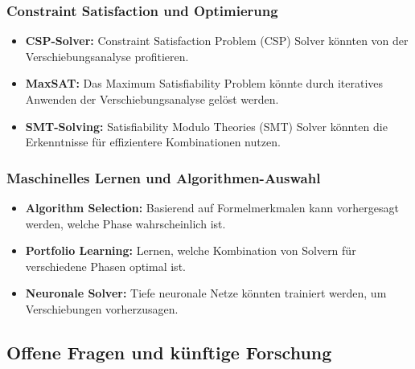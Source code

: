 ﻿\documentclass[a4paper,12pt]{article}
\theoremstyle{definition}
\begin{document}
\subsubsection{Constraint Satisfaction und Optimierung}

\begin{itemize}
	\item \textbf{CSP-Solver:} Constraint Satisfaction Problem (CSP) Solver könnten von der Verschiebungsanalyse profitieren.
	
	\item \textbf{MaxSAT:} Das Maximum Satisfiability Problem könnte durch iteratives Anwenden der Verschiebungsanalyse gelöst werden.
	
	\item \textbf{SMT-Solving:} Satisfiability Modulo Theories (SMT) Solver könnten die Erkenntnisse für effizientere Kombinationen nutzen.
\end{itemize}

\subsubsection{Maschinelles Lernen und Algorithmen-Auswahl}

\begin{itemize}
	\item \textbf{Algorithm Selection:} Basierend auf Formelmerkmalen kann vorhergesagt werden, welche Phase wahrscheinlich ist.
	
	\item \textbf{Portfolio Learning:} Lernen, welche Kombination von Solvern für verschiedene Phasen optimal ist.
	
	\item \textbf{Neuronale Solver:} Tiefe neuronale Netze könnten trainiert werden, um Verschiebungen vorherzusagen.
\end{itemize}

\subsection{Offene Fragen und künftige Forschung}
\end{document}
